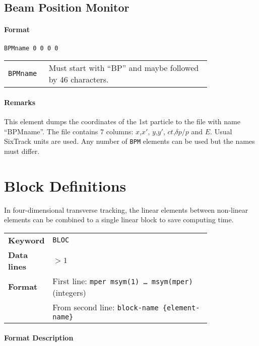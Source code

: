 \subsection{Beam Position Monitor} \label{BPM}

\paragraph{Format} \texttt{BPMname 0 0 0 0}

\bigskip
\begin{tabular}{@{}lp{0.8\linewidth}}
    \texttt{BPMname} & Must start with ``BP'' and maybe followed by 46 characters.
\end{tabular}

\paragraph{Remarks}
This element dumps the coordinates of the 1st particle to the file with name ``BPMname''.
The file contains 7 columns: $x$,$x'$, $y$,$y'$, $ct$,$\delta p/p$ and $E$.
Usual SixTrack units are used.
Any number of \texttt{BPM} elements can be used but the names must differ.


\section{Block Definitions} \label{BloDef}

In four-dimensional transverse tracking, the linear elements between non-linear elements can be combined to a single linear block to save computing time.

\bigskip
\begin{tabular}{@{}lp{0.8\linewidth}}
    \textbf{Keyword}    & \texttt{BLOC} \\
    \textbf{Data lines} & $>1$ \\
    \textbf{Format}     & First line: \texttt{mper msym(1) \dots~msym(mper)} (integers) \\
                        & From second line: \texttt{block-name \{element-name\}}
\end{tabular}

\paragraph{Format Description}~

